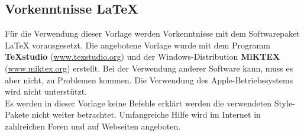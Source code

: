 \newpage
\subsection{Vorkenntnisse \LaTeX}
Für die Verwendung dieser Vorlage werden Vorkenntnisse mit dem Softwarepaket {\LaTeX} vorausgesetzt. Die angebotene Vorlage wurde mit dem Programm \textbf{TeXstudio} (\url{www.texstudio.org}) und der Windows-Distribution \textbf{MiKTEX} (\url{www.miktex.org}) erstellt. Bei der Verwendung anderer Software kann, muss es aber nicht, zu Problemen kommen. Die Verwendung des Apple-Betriebssystems wird nicht unterstützt.\\
Es werden in dieser Vorlage keine Befehle erklärt \bzw werden die verwendeten Style\hbox{-}Pakete nicht weiter betrachtet. Umfangreiche Hilfe wird im Internet in zahlreichen Foren und auf Webseiten angeboten.

